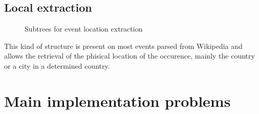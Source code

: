 \documentclass{llncs}
\begin{document}
\newpage
\subsection{Local extraction}

\begin{figure}[h]
	\centering
	\hspace{20mm}
	\caption{Subtrees for event location extraction}
	\label{fig:locals}
\end{figure}

This kind of structure is present on most events parsed from Wikipedia and allows the retrieval of the phisical location of the occurence, mainly the country or a city in a determined country.

%
\section{Main implementation problems}
\end{document}
